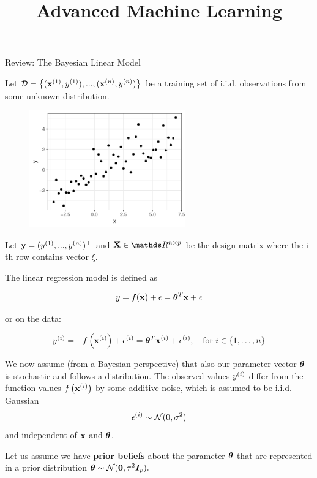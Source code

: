 \documentclass[11pt,compress,t,notes=noshow, xcolor=table]{beamer}
\title{Advanced Machine Learning}
\date{}
\begin{document}


\begin{vbframe}{Review: The Bayesian Linear Model}

    Let $\D = \left\{(\xi[1], \yi[1]), ..., (\xi[n], \yi[n])\right\}$ be a training set of i.i.d. observations from some unknown distribution.

    \begin{figure}
      \includegraphics[width=0.6\textwidth]{figure/bayes_lm/example.pdf}
    \end{figure}

    Let $\yv = (\yi[1], ..., \yi[n])^\top$ and $\Xmat \in \R^{n \times p}$ be the design matrix where the i-th row contains vector $\xi$.  
    
    \framebreak

    The linear regression model is defined as

    $$
    y = \fx + \epsilon = \thetab^T \xv + \epsilon 
    $$

    or on the data:

    \begin{eqnarray*}
    \yi &=& \fxi + \epsi = \thetab^T \xi + \epsi, \quad \text{for } i \in \{1, \ldots, n\}
    \end{eqnarray*}
    

    We now assume (from a Bayesian perspective) that also our parameter vector $\thetab$ is stochastic and follows a distribution.
    The observed values $\yi$ differ from the function values $\fxi$ by some additive noise, which is assumed to be i.i.d. Gaussian 
    $$
    \epsi \sim \mathcal{N}(0, \sigma^2)$$
    and independent of $\xv$ and $\thetab$.

    \framebreak

    Let us assume we have \textbf{prior beliefs} about the parameter $\thetab$ that are represented in a prior distribution $\thetab \sim \mathcal{N}(\zero, \tau^2 \id_p).$


\end{vbframe}
\end{document}

